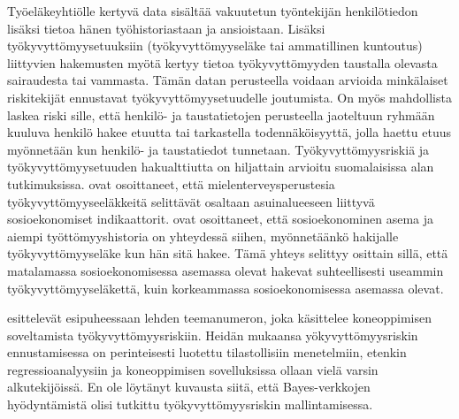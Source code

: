 Työeläkeyhtiölle kertyvä data sisältää vakuutetun työntekijän henkilötiedon lisäksi tietoa hänen työhistoriastaan ja ansioistaan. Lisäksi työkyvyttömyysetuuksiin (työkyvyttömyyseläke tai ammatillinen kuntoutus) liittyvien hakemusten myötä kertyy tietoa työkyvyttömyyden taustalla olevasta sairaudesta tai vammasta. Tämän datan perusteella voidaan arvioida minkälaiset riskitekijät ennustavat työkyvyttömyysetuudelle joutumista. On myös mahdollista laskea riski sille, että henkilö- ja taustatietojen perusteella jaoteltuun ryhmään kuuluva henkilö hakee etuutta tai tarkastella todennäköisyyttä, jolla haettu etuus myönnetään kun henkilö- ja taustatiedot tunnetaan. Työkyvyttömyysriskiä ja työkyvyttömyysetuuden hakualttiutta on hiljattain arvioitu suomalaisissa alan tutkimuksissa. \citet{karolaakso_contextual_2021, karolaakso_socioeconomic_2020} ovat osoittaneet, että mielenterveysperustesia työkyvyttömyyseeläkkeitä selittävät osaltaan asuinalueeseen liittyvä sosioekonomiset indikaattorit. \citet{perhoniemi_determinants_2020, perhoniemi_tyokyvyttomyyselakehakemusten_2020} ovat osoittaneet, että sosioekonominen asema ja aiempi työttömyyshistoria on yhteydessä siihen, myönnetäänkö hakijalle työkyvyttömyyseläke kun hän sitä hakee. Tämä yhteys selittyy osittain sillä, että matalamassa sosioekonomisessa asemassa olevat hakevat suhteellisesti useammin työkyvyttömyyseläkettä, kuin korkeammassa sosioekonomisessa asemassa olevat.

\citet{gross_machine_2020} esittelevät esipuheessaan lehden teemanumeron, joka käsittelee koneoppimisen soveltamista työkyvyttömyysriskiin. Heidän mukaansa yökyvyttömyysriskin ennustamisessa on perinteisesti luotettu tilastollisiin menetelmiin, etenkin regressioanalyysiin ja koneoppimisen sovelluksissa ollaan vielä varsin alkutekijöissä. En ole löytänyt kuvausta siitä, että Bayes-verkkojen hyödyntämistä olisi tutkittu työkyvyttömyysriskin mallintamisessa. 


